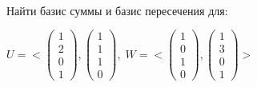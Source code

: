\bigskip

\begin{problem}~

  Найти базис суммы и базис пересечения для:

  $U = <
  \begin{pmatrix}
    1 \\ 2 \\ 0 \\ 1
  \end{pmatrix},
  \begin{pmatrix}
    1 \\ 1 \\ 1 \\ 0
  \end{pmatrix}, \; W = <
  \begin{pmatrix}
    1 \\ 0 \\ 1 \\ 0
  \end{pmatrix},
  \begin{pmatrix}
    1 \\ 3 \\ 0 \\ 1
  \end{pmatrix}>$

  \begin{solution}


\end{solution}
\end{problem}
